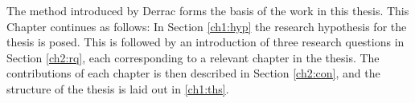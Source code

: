 


The method  introduced by Derrac \cite{Derrac2015} forms the basis of the work in this thesis. This Chapter continues as follows: In Section \ref{ch1:hyp} the research hypothesis for the thesis is posed. This is followed by an introduction of three research questions in Section \ref{ch2:rq}, each corresponding to a relevant chapter in the thesis. The contributions of each chapter is then described in Section \ref{ch2:con}, and the structure of the thesis is laid out in  \ref{ch1:ths}. %



